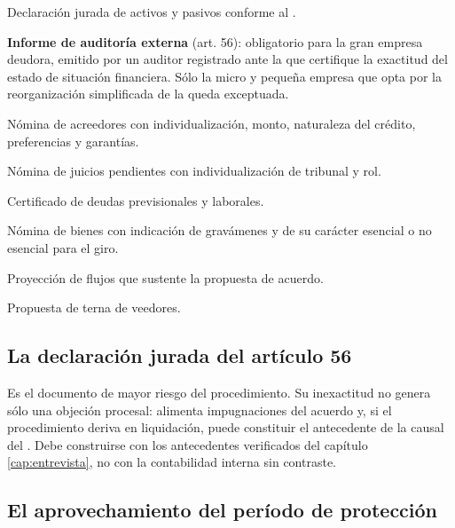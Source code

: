 \bloqueDocumental

\begin{checklist}
  \item Declaración jurada de activos y pasivos conforme al .
  \item \textbf{Informe de auditoría externa} (art. 56): obligatorio para la gran empresa
  deudora, emitido por un auditor registrado ante la \cmf{} que certifique la exactitud del estado
  de situación financiera. Sólo la micro y pequeña empresa que opta por la reorganización
  simplificada de la \Lreforma{} queda exceptuada.
  \item Nómina de acreedores con individualización, monto, naturaleza del crédito,
  preferencias y garantías.
  \item Nómina de juicios pendientes con individualización de tribunal y rol.
  \item Certificado de deudas previsionales y laborales.
  \item Nómina de bienes con indicación de gravámenes y de su carácter esencial o no
  esencial para el giro.
  \item Proyección de flujos que sustente la propuesta de acuerdo.
  \item Propuesta de terna de veedores.
\end{checklist}

\bloqueFocos

\subsection{La declaración jurada del artículo 56}

Es el documento de mayor riesgo del procedimiento. Su inexactitud no genera sólo una
objeción procesal: alimenta impugnaciones del acuerdo y, si el procedimiento deriva en
liquidación, puede constituir el antecedente de la causal del  .
Debe construirse con los antecedentes verificados del capítulo \ref{cap:entrevista}, no
con la contabilidad interna sin contraste.

\subsection{El aprovechamiento del período de protección}

